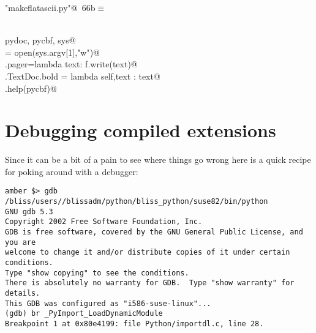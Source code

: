 \documentclass[10pt,a4paper,twoside,notitlepage]{article}
\begin{document}
\begin{flushleft} \small
\begin{minipage}{\linewidth}\label{scrap12}\raggedright\small
{} \verb@"makeflatascii.py"@\nobreak\ {\footnotesize {66b}}$\equiv$
\vspace{-1ex}
\begin{list}{}{} \item
\mbox{}\verb@@\\
\mbox{}\verb@import pydoc, pycbf, sys@\\
\mbox{}\verb@f = open(sys.argv[1],"w")@\\
\mbox{}\verb@pydoc.pager=lambda text: f.write(text)@\\
\mbox{}\verb@pydoc.TextDoc.bold = lambda self,text : text@\\
\mbox{}\verb@pydoc.help(pycbf)@\\
\mbox{}\verb@@{\NWsep}
\end{list}
\vspace{-1.5ex}
\footnotesize
\begin{list}{}{\setlength{\itemsep}{-\parsep}\setlength{\itemindent}{-\leftmargin}}

\item{}
\end{list}
\end{minipage}\vspace{4ex}
\end{flushleft}
\section{Debugging compiled extensions}

Since it can be a bit of a pain to see where things go wrong here is a
quick recipe for poking around with a debugger:

\begin{verbatim}
amber $> gdb /bliss/users//blissadm/python/bliss_python/suse82/bin/python
GNU gdb 5.3
Copyright 2002 Free Software Foundation, Inc.
GDB is free software, covered by the GNU General Public License, and you are
welcome to change it and/or distribute copies of it under certain conditions.
Type "show copying" to see the conditions.
There is absolutely no warranty for GDB.  Type "show warranty" for details.
This GDB was configured as "i586-suse-linux"...
(gdb) br _PyImport_LoadDynamicModule
Breakpoint 1 at 0x80e4199: file Python/importdl.c, line 28.
\end{verbatim}
\end{document}
